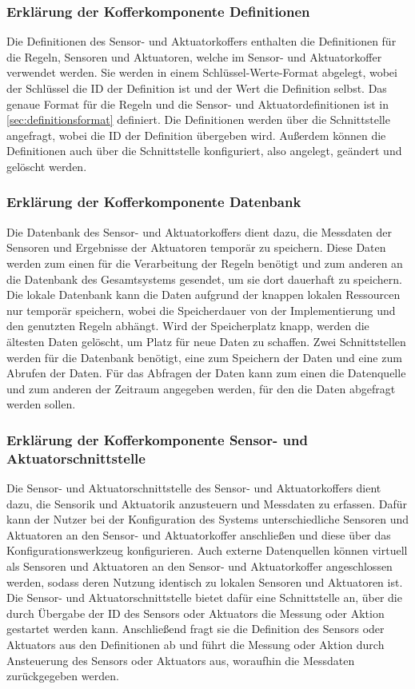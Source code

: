 \subsubsection{Erklärung der Kofferkomponente Definitionen}
Die Definitionen des Sensor- und Aktuatorkoffers enthalten die Definitionen für die Regeln, Sensoren und Aktuatoren, welche im Sensor- und Aktuatorkoffer verwendet werden.
Sie werden in einem Schlüssel-Werte-Format abgelegt, wobei der Schlüssel die ID der Definition ist und der Wert die Definition selbst.
Das genaue Format für die Regeln und die Sensor- und Aktuatordefinitionen ist in \cref{sec:definitionsformat} definiert.
Die Definitionen werden über die Schnittstelle angefragt, wobei die ID der Definition übergeben wird.
Außerdem können die Definitionen auch über die Schnittstelle konfiguriert, also angelegt, geändert und gelöscht werden.

\subsubsection{Erklärung der Kofferkomponente Datenbank}
Die Datenbank des Sensor- und Aktuatorkoffers dient dazu, die Messdaten der Sensoren und Ergebnisse der Aktuatoren temporär zu speichern.
Diese Daten werden zum einen für die Verarbeitung der Regeln benötigt und zum anderen an die Datenbank des Gesamtsystems gesendet, um sie dort dauerhaft zu speichern.
Die lokale Datenbank kann die Daten aufgrund der knappen lokalen Ressourcen nur temporär speichern, wobei die Speicherdauer von der Implementierung und den genutzten Regeln abhängt.
Wird der Speicherplatz knapp, werden die ältesten Daten gelöscht, um Platz für neue Daten zu schaffen.
Zwei Schnittstellen werden für die Datenbank benötigt, eine zum Speichern der Daten und eine zum Abrufen der Daten.
Für das Abfragen der Daten kann zum einen die Datenquelle und zum anderen der Zeitraum angegeben werden, für den die Daten abgefragt werden sollen.

\subsubsection{Erklärung der Kofferkomponente Sensor- und Aktuatorschnittstelle}
Die Sensor- und Aktuatorschnittstelle des Sensor- und Aktuatorkoffers dient dazu, die Sensorik und Aktuatorik anzusteuern und Messdaten zu erfassen.
Dafür kann der Nutzer bei der Konfiguration des Systems unterschiedliche Sensoren und Aktuatoren an den Sensor- und Aktuatorkoffer anschließen und diese über das Konfigurationswerkzeug konfigurieren.
Auch externe Datenquellen können virtuell als Sensoren und Aktuatoren an den Sensor- und Aktuatorkoffer angeschlossen werden, sodass deren Nutzung identisch zu lokalen Sensoren und Aktuatoren ist.
Die Sensor- und Aktuatorschnittstelle bietet dafür eine Schnittstelle an, über die durch Übergabe der ID des Sensors oder Aktuators die Messung oder Aktion gestartet werden kann.
Anschließend fragt sie die Definition des Sensors oder Aktuators aus den Definitionen ab und führt die Messung oder Aktion durch Ansteuerung des Sensors oder Aktuators aus, woraufhin die Messdaten zurückgegeben werden.


